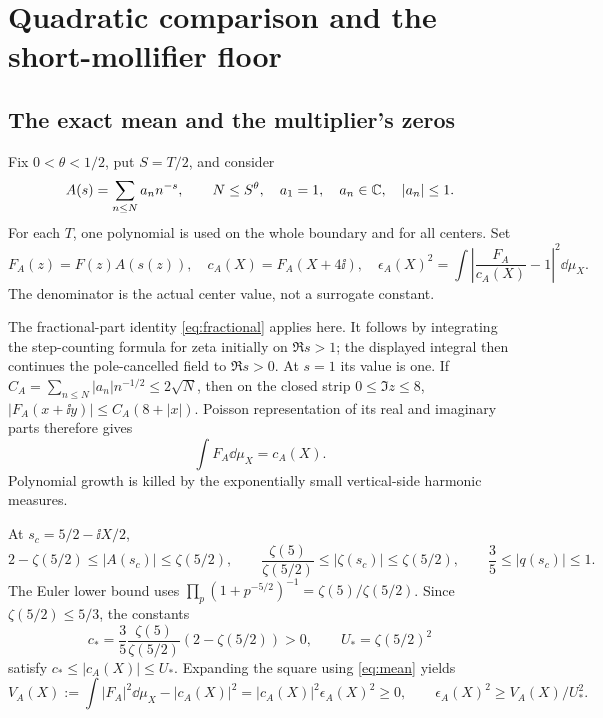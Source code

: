 \section{Quadratic comparison and the short-mollifier floor}\label{sec:quadratic}

\subsection{The exact mean and the multiplier's zeros}

Fix \(0<\theta<1/2\), put \(S=T/2\), and consider
\begin{equation}\label{eq:A-class}
 A(s)=\sum_{n\le N}a_nn^{-s},\qquad
 N\le S^\theta,\quad a_1=1,\quad a_n\in\mathbb C,\quad |a_n|\le1.
\end{equation}
For each \(T\), one polynomial is used on the whole boundary and for
all centers. Set
\[
 F_A(z)=F(z)A(s(z)),\quad c_A(X)=F_A(X+4\ii),\quad
 \epsilon_A(X)^2=\int\left|\frac{F_A}{c_A(X)}-1\right|^2\dd\mu_X .
\]
The denominator is the actual center value, not a surrogate constant.

The fractional-part identity \eqref{eq:fractional} applies here.
It follows by integrating the step-counting formula for zeta initially
on \(\Re s>1\); the displayed integral then continues the pole-cancelled
field to \(\Re s>0\). At \(s=1\) its value is one. If
\(C_A=\sum_{n\le N}|a_n|n^{-1/2}\le2\sqrt N\), then on the closed
strip \(0\le\Im z\le8\),
\(|F_A(x+\ii y)|\le C_A(8+|x|)\).
Poisson representation of its real and imaginary parts therefore gives
\begin{equation}\label{eq:mean}
 \int F_A\dd\mu_X=c_A(X).
\end{equation}
Polynomial growth is killed by the exponentially small vertical-side
harmonic measures.

At \(s_c=5/2-\ii X/2\),
\[
 2-\zeta(5/2)\le|A(s_c)|\le\zeta(5/2),\qquad
 \frac{\zeta(5)}{\zeta(5/2)}\le|\zeta(s_c)|\le\zeta(5/2),\qquad
 \frac35\le|q(s_c)|\le1.
\]
The Euler lower bound uses
\(\prod_p(1+p^{-5/2})^{-1}=\zeta(5)/\zeta(5/2)\).
Since \(\zeta(5/2)\le5/3\), the constants
\begin{equation}\label{eq:center-bounds}
 c_*=\frac35\frac{\zeta(5)}{\zeta(5/2)}(2-\zeta(5/2))>0,\qquad
 U_*=\zeta(5/2)^2
\end{equation}
satisfy \(c_*\le|c_A(X)|\le U_*\).
Expanding the square using \eqref{eq:mean} yields
\begin{equation}\label{eq:variance}
 V_A(X):=\int|F_A|^2\dd\mu_X-|c_A(X)|^2
 =|c_A(X)|^2\epsilon_A(X)^2\ge0,\qquad
 \epsilon_A(X)^2\ge V_A(X)/U_*^2.
\end{equation}

